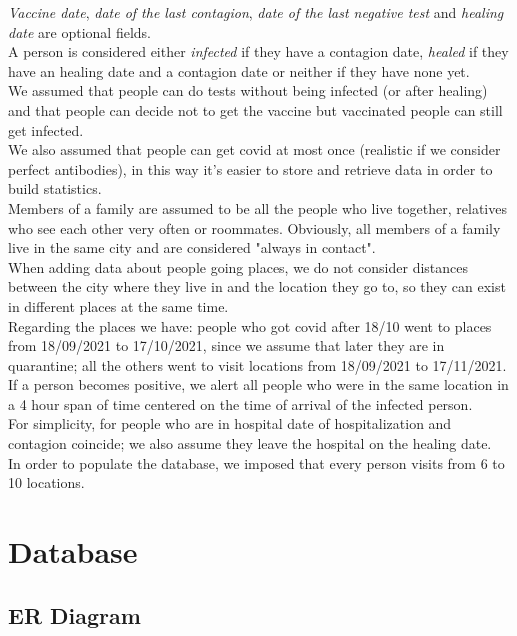 \documentclass[12pt, a4paper]{article}
\begin{document}
\emph{Vaccine date}, \emph{date of the last contagion}, \emph{date of the last 
negative test} and \emph{healing date} are optional fields. \\ 
A person is considered either \emph{infected} if they have a contagion date, 
\emph{healed} if they have an healing date and a contagion date or neither if 
they have none yet. \\
We assumed that people can do tests without being infected (or after healing) 
and that people can decide not to get the vaccine but vaccinated people can 
still get infected. \\
We also assumed that people can get covid at most once (realistic if we 
consider perfect antibodies), in this way it's easier to store and retrieve 
data in order to build statistics. \\
Members of a family are assumed to be all the people who live together, 
relatives who see each other very often or roommates. Obviously, all members 
of a family live in the same city and are considered "always in contact". \\
When adding data about people going places, we do not consider distances 
between the city where they live in and the location they go to, so they can 
exist in different places at the same time.  \\   
Regarding the places we have: people who got covid after 18/10 went to places 
from 18/09/2021 to 17/10/2021, since we assume that later they are in 
quarantine; all the others went to visit locations from 18/09/2021 to 
17/11/2021. 
If a person becomes positive, we alert all people who were in the same location
in a 4 hour span of time centered on the time of arrival of the infected
person. \\
For simplicity, for people who are in hospital date of hospitalization and 
contagion coincide; we also assume they leave the hospital on the healing 
date.  \\
In order to populate the database, we imposed that every person visits from 6 
to 10 locations. 

\clearpage

\section{Database}

\subsection{ER Diagram}
\end{document}
